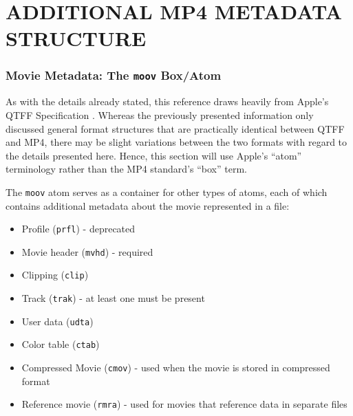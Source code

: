 %
%
%
%	 
%



\chapter{\uppercase{Additional MP4 Metadata Structure}}
\label{cha:mp4-metadata-structure}

\subsection{Movie Metadata: The \texttt{moov} Box/Atom}

As with the details already stated, this reference draws heavily from Apple's QTFF Specification \cite{apple2016}. Whereas the previously presented information only discussed general format structures that are practically identical between QTFF and MP4, there may be slight variations between the two formats with regard to the details presented here. Hence, this section will use Apple's ``atom'' terminology rather than the MP4 standard's ``box'' term.

The \texttt{moov} atom serves as a container for other types of atoms, each of which contains additional metadata about the movie represented in a file:

\begin{itemize}
	\item Profile (\texttt{prfl}) - deprecated
	\item Movie header (\texttt{mvhd}) - required
	\item Clipping (\texttt{clip})
	\item Track (\texttt{trak}) - at least one must be present
	\item User data (\texttt{udta})
	\item Color table (\texttt{ctab})
	\item Compressed Movie (\texttt{cmov}) - used when the movie is stored in compressed format
	\item Reference movie (\texttt{rmra}) - used for movies that reference data in separate files
\end{itemize}


